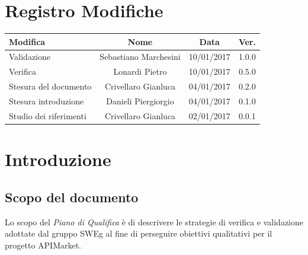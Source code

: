 \documentclass[12pt,a4paper,titlepage]{article}
\begin{document}
	
	
	\clearpage %
	
	
\chead{}
\cfoot{}
\rfoot{\thepage}
\renewcommand{\headrulewidth}{0.2pt}
\renewcommand{\footrulewidth}{0.2pt}
		
\section{Registro Modifiche}
\small %
	
{\renewcommand\arraystretch{1.2}
		\begin{tabular}{|l|c|c|c|}
			\hline
			{\textbf{Modifica}}&{\textbf{Nome}}&{\textbf{Data}}&{\textbf{Ver.}}\\
			\hline
			Validazione & Sebastiano Marchesini & 10/01/2017 & 1.0.0 \\
			\hline
			Verifica & Lonardi Pietro & 10/01/2017 & 0.5.0 \\
			\hline
			Stesura del documento & Crivellaro Gianluca & 04/01/2017 & 0.2.0 \\
			\hline
			Stesura introduzione & Danieli Piergiorgio & 04/01/2017 & 0.1.0 \\
			\hline
			Studio dei riferimenti & Crivellaro Gianluca & 02/01/2017 & 0.0.1 \\
			\hline
		\end{tabular}
}
	\newpage
	
	\tableofcontents
	\thispagestyle{empty}
	\newpage
	\section{Introduzione}
	\subsection{Scopo del documento}
	Lo scopo del \textit{Piano di Qualifica} è di descrivere le strategie di verifica e validazione adottate dal gruppo SWEg al fine di perseguire obiettivi qualitativi per il progetto APIMarket.
	
\end{document}
